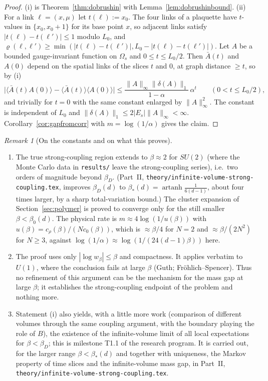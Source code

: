 \documentclass[11pt,a4paper]{article}
\theoremstyle{definition}
\theoremstyle{remark}
\newtheorem{remark}[theorem]{Remark}
\newcommand{\norm}[1]{\lVert #1\rVert}
\begin{document}
\begin{proof}
(i) is Theorem~\ref{thm:dobrushin} with Lemma~\ref{lem:dobrushinbound}. (ii) For a link $\ell=(x,\mu)$ let $t(\ell):=x_0$.
The four links of a plaquette have $t$-values in $\{x_0,x_0+1\}$ for its base point $x$, so adjacent links satisfy
$|t(\ell)-t(\ell')|\le1$ modulo $L_0$, and $\varrho(\ell,\ell')\ge\min(|t(\ell)-t(\ell')|,L_0-|t(\ell)-t(\ell')|)$. Let $A$ be a
bounded gauge-invariant function on $\Omega_s$ and $0\le t\le L_0/2$. Then $\bar A(t)$ and $A(0)$ depend on the spatial links of the
slices $t$ and $0$, at graph distance $\ge t$, so by (i)
\[
\bigl|\langle\bar A(t)A(0)\rangle-\langle\bar A(t)\rangle\langle A(0)\rangle\bigr|\le\frac{\norm A_\infty\norm{\delta(A)}_1}{1-\alpha}\,\alpha^{t}
\qquad(0<t\le L_0/2),
\]
and trivially for $t=0$ with the same constant enlarged by $\norm A_\infty^2$. The constant is independent of $L_0$ and
$\norm{\delta(A)}_1\le2|E_s|\norm A_\infty<\infty$. Corollary~\ref{cor:gapfromcorr} with $m=\log(1/\alpha)$ gives the claim.
\end{proof}

\begin{remark}[On the constants and on what this proves]
\begin{enumerate}[label=(\roman*)]
\item The true strong-coupling region extends to $\beta\approx2$ for $SU(2)$ (where the Monte Carlo data in \texttt{results/}
leave the strong-coupling series), i.e.\ two orders of magnitude beyond $\beta_D$. (Part~II,
\texttt{theory/infinite-volume-strong-coupling.tex}, improves $\beta_D(d)$ to $\beta_*(d)=\operatorname{artanh}\frac1{6(d-1)}$,
about four times larger, by a sharp total-variation bound.) The cluster expansion of Section~\ref{sec:polymer} is proved to
converge only for the still smaller $\beta<\beta_0(d)$. The physical rate is $m\approx4\log(1/u(\beta))$ with
$u(\beta)=c_\rho(\beta)/(Nc_0(\beta))$, which is $\approx\beta/4$ for $N=2$ and $\approx\beta/(2N^2)$ for $N\ge3$, against
$\log(1/\alpha)\approx\log(1/(24(d-1)\beta))$ here.
\item The proof uses only $|{\log w_\beta}|\le\beta$ and compactness. It applies verbatim to $U(1)$, where the conclusion fails
at large $\beta$ (Guth; Fröhlich--Spencer). Thus no refinement of this argument can be the mechanism for the mass gap at
large $\beta$; it establishes the strong-coupling endpoint of the problem and nothing more.
\item Statement (i) also yields, with a little more work (comparison of different volumes through the same coupling
argument, with the boundary playing the role of $B$), the existence of the infinite-volume limit of all local expectations
for $\beta<\beta_D$; this is milestone T1.1 of the research program. It is carried out, for the larger range
$\beta<\beta_*(d)$ and together with uniqueness, the Markov property of time slices and the infinite-volume mass gap, in
Part~II, \texttt{theory/infinite-volume-strong-coupling.tex}.
\end{enumerate}
\end{remark}
\end{document}
